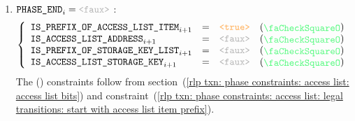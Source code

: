\begin{enumerate}[resume]
	\item \If $\phaseEnd _{i} = \false$ \Then:
		\[
			\left\{ \begin{array}{lclc}
				\rlpTxnSharedColumnIsPrefixOfAccessListItem _{i + 1} & = & \true  & (\sanityCheck) \\
				\rlpTxnSharedColumnIsAccessListAddress      _{i + 1} & = & \false & (\sanityCheck) \\
				\rlpTxnSharedColumnIsPrefixOfStorageKeyList _{i + 1} & = & \false & (\sanityCheck) \\
				\rlpTxnSharedColumnIsAccessListStorageKey   _{i + 1} & = & \false & (\sanityCheck) \\
			\end{array} \right.
		\]
		\saNote{}
		The (\sanityCheck) constraints follow from
		section~(\ref{rlp txn: phase constraints: access list: access list bits}) and
		constraint~(\ref{rlp txn: phase constraints: access list: legal transitions: start with access list item prefix}).
\end{enumerate}
